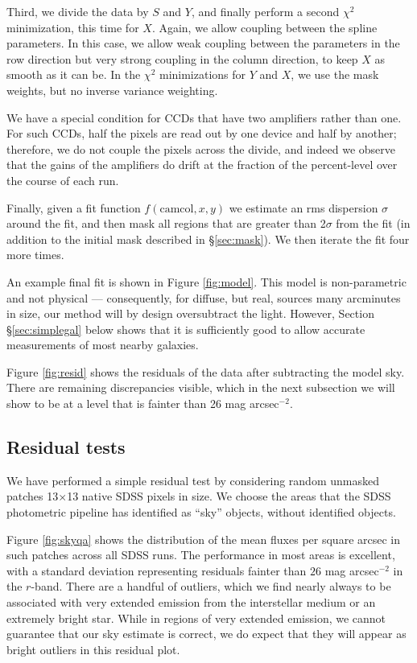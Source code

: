 \documentclass[10pt,preprint]{aastex}
\begin{document}
Third, we divide the data by $S$ and $Y$, and finally perform a second
$\chi^2$ minimization, this time for $X$. Again, we allow coupling
between the spline parameters.  In this case, we allow weak coupling
between the parameters in the row direction but very strong coupling
in the column direction, to keep $X$ as smooth as it can be. In the
$\chi^2$ minimizations for $Y$ and $X$, we use the mask weights, but
no inverse variance weighting.

We have a special condition for CCDs that have two amplifiers rather
than one. For such CCDs, half the pixels are read out by one device
and half by another; therefore, we do not couple the pixels across the
divide, and indeed we observe that the gains of the amplifiers do
drift at the fraction of the percent-level over the course of each
run.

Finally, given a fit function $f(\mathrm{camcol}, x, y)$ we estimate
an rms dispersion $\sigma$ around the fit, and then mask all regions
that are greater than 2$\sigma$ from the fit (in addition to the
initial mask described in \S\ref{sec:mask}). We then iterate the fit
four more times.

An example final fit is shown in Figure \ref{fig:model}. This model is
non-parametric and not physical --- consequently, for diffuse, but
real, sources many arcminutes in size, our method will by design
oversubtract the light.  However, Section
\S\ref{sec:simplegal} below shows that it is sufficiently good to
allow accurate measurements of most nearby galaxies.

Figure \ref{fig:resid} shows the residuals of the data after
subtracting the model sky.  There are remaining discrepancies visible,
which in the next subsection we will show to be at a level that is
fainter than 26 mag arcsec$^{-2}$.

\subsection{Residual tests}
\label{sec:residuals}

We have performed a simple residual test by considering random
unmasked patches 13$\times$13 native SDSS pixels in size. We choose
the areas that the SDSS photometric pipeline has identified as ``sky''
objects, without identified objects.  

Figure \ref{fig:skyqa} shows the distribution of the mean fluxes per
square arcsec in such patches across all SDSS runs. The performance in
most areas is excellent, with a standard deviation representing
residuals fainter than $26$ mag arcsec$^{-2}$ in the $r$-band. There
are a handful of outliers, which we find nearly always to be
associated with very extended emission from the interstellar medium or
an extremely bright star. While in regions of very extended emission,
we cannot guarantee that our sky estimate is correct, we do expect
that they will appear as bright outliers in this residual plot.
\end{document}
